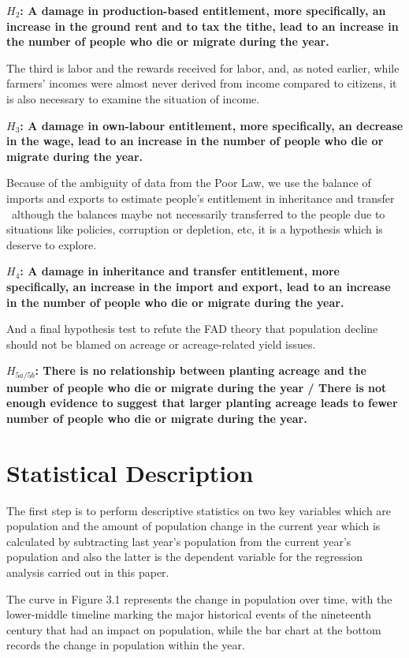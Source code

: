 \textbf{$H_2$: A damage in production-based entitlement, more specifically, an increase in the ground rent and to tax the tithe, lead to an increase in the number of people who die or migrate during the year.}

The third is labor and the rewards received for labor, and, as noted earlier, while farmers' incomes were almost never derived from income compared to citizens, it is also necessary to examine the situation of income.

\textbf{$H_3$: A damage in own-labour entitlement, more specifically, an decrease in the wage, lead to an increase in the number of people who die or migrate during the year.}

Because of the ambiguity of data from the Poor Law, we use the balance of imports and exports to estimate people's entitlement in inheritance and transfer \textemdash\
although the balances maybe not necessarily transferred to the people due to situations like policies, corruption or depletion, etc, it is a hypothesis which is deserve to explore.

\textbf{$H_4$: A damage in inheritance and transfer entitlement, more specifically, an increase in the import and export, lead to an increase in the number of people who die or migrate during the year.}

And a final hypothesis test to refute the FAD theory that population decline should not be blamed on acreage or acreage-related yield issues.

\textbf{$H_{5a/5b}$: There is no relationship between planting acreage and the number of people who die or migrate during the year / There is not enough evidence to suggest that larger planting acreage leads to fewer number of people who die or migrate during the year.}

\section{Statistical Description}
The first step is to perform descriptive statistics on two key variables which are population and the amount of population change in the current year which is calculated by subtracting last year's population from the current year's population and also the latter is the dependent variable for the regression analysis carried out in this paper.

The curve in Figure 3.1 represents the change in population over time, with the lower-middle timeline marking the major historical events of the nineteenth century that had an impact on population, while the bar chart at the bottom records the change in population within the year.


